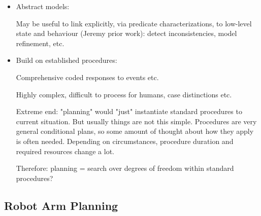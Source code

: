 \begin{itemize}

\item Abstract models:

    May be useful to link explicitly, via predicate characterizations,
    to low-level state and behaviour (Jeremy prior work): detect
    inconsistencies, model refinement, etc.
 
\item Build on established procedures:

    Comprehensive coded responses to events etc.
    
    Highly complex, difficult to process for humans, case distinctions
    etc.
    
    Extreme end: "planning" would "just" instantiate standard
    procedures to current situation. But usually things are not this
    simple.  Procedures are very general conditional plans, so some
    amount of thought about how they apply is often needed.  Depending
    on circumstances, procedure duration and required resources change
    a lot.
    
    Therefore: planning = search over degrees of freedom within
    standard procedures?
    
\end{itemize}





\subsection{Robot Arm Planning}

